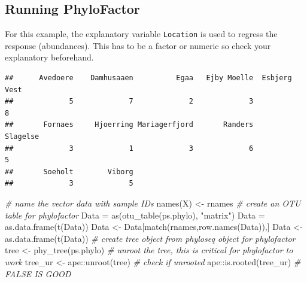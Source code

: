 \documentclass[
]{book}
\newenvironment{Shaded}{\begin{snugshade}}{\end{snugshade}}
\newcommand{\CommentTok}[1]{\textcolor[rgb]{0.56,0.35,0.01}{\textit{#1}}}
\newcommand{\FunctionTok}[1]{\textcolor[rgb]{0.00,0.00,0.00}{#1}}
\newcommand{\NormalTok}[1]{#1}
\newcommand{\OtherTok}[1]{\textcolor[rgb]{0.56,0.35,0.01}{#1}}
\newcommand{\SpecialCharTok}[1]{\textcolor[rgb]{0.00,0.00,0.00}{#1}}
\newcommand{\StringTok}[1]{\textcolor[rgb]{0.31,0.60,0.02}{#1}}
\begin{document}
\hypertarget{running-phylofactor}{%
\subsection{Running PhyloFactor}\label{running-phylofactor}}

For this example, the explanatory variable \texttt{Location} is used to regress the response (abundances). This has to be a factor or numeric so check your explanatory beforehand.

\begin{Shaded}
\end{Shaded}

\begin{verbatim}
##      Avedoere    Damhusaaen          Egaa   Ejby Moelle  Esbjerg Vest 
##             5             7             2             3             8 
##       Fornaes     Hjoerring Mariagerfjord       Randers      Slagelse 
##             3             1             3             6             5 
##       Soeholt        Viborg 
##             3             5
\end{verbatim}

\begin{Shaded}
\begin{Highlighting}[]
\CommentTok{\# name the vector data with sample IDs }
\FunctionTok{names}\NormalTok{(X) }\OtherTok{\textless{}{-}}\NormalTok{ rnames}
\CommentTok{\# create an OTU table for phylofactor }
\NormalTok{Data }\OtherTok{=} \FunctionTok{as}\NormalTok{(}\FunctionTok{otu\_table}\NormalTok{(ps.phylo), }\StringTok{"matrix"}\NormalTok{)}
\NormalTok{Data }\OtherTok{=} \FunctionTok{as.data.frame}\NormalTok{(}\FunctionTok{t}\NormalTok{(Data))}
\NormalTok{Data }\OtherTok{\textless{}{-}}\NormalTok{ Data[}\FunctionTok{match}\NormalTok{(rnames,}\FunctionTok{row.names}\NormalTok{(Data)),] }
\NormalTok{Data }\OtherTok{\textless{}{-}} \FunctionTok{as.data.frame}\NormalTok{(}\FunctionTok{t}\NormalTok{(Data))}
\CommentTok{\# create tree object from phyloseq object for phylofactor}
\NormalTok{tree }\OtherTok{\textless{}{-}} \FunctionTok{phy\_tree}\NormalTok{(ps.phylo) }
\CommentTok{\# unroot the tree, this is critical for phylofactor to work}
\NormalTok{tree\_ur }\OtherTok{\textless{}{-}}\NormalTok{ ape}\SpecialCharTok{::}\FunctionTok{unroot}\NormalTok{(tree)}
\CommentTok{\# check if unrooted}
\NormalTok{ape}\SpecialCharTok{::}\FunctionTok{is.rooted}\NormalTok{(tree\_ur) }\CommentTok{\# FALSE IS GOOD}
\end{Highlighting}
\end{Shaded}
\end{document}
